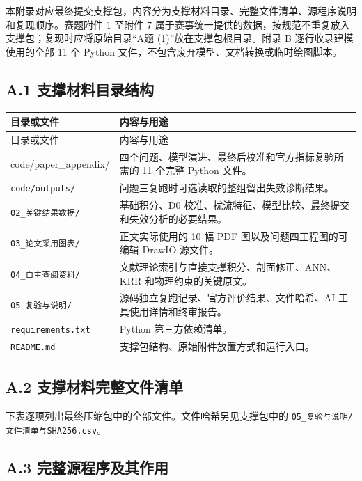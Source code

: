 本附录对应最终提交支撑包，内容分为支撑材料目录、完整文件清单、源程序说明和复现顺序。赛题附件 1 至附件 7 属于赛事统一提供的数据，按规范不重复放入支撑包；复现时应将原始目录“A题 (1)”放在支撑包根目录。附录 B 逐行收录建模使用的全部 11 个 Python 文件，不包含废弃模型、文档转换或临时绘图脚本。

\subsection*{A.1 支撑材料目录结构}

\begingroup
\small
\setlength{\tabcolsep}{4pt}
\begin{longtable}{p{}p{}}
\toprule
目录或文件 & 内容与用途 \\
\midrule
\endfirsthead
\toprule
目录或文件 & 内容与用途 \\
\midrule
\endhead
{\ttfamily\raggedright code/paper\_\allowbreak appendix/\par} & 四个问题、模型演进、最终后校准和官方指标复验所需的 11 个完整 Python 文件。 \\
\texttt{code/outputs/} & 问题三复跑时可选读取的整组留出失效诊断结果。 \\
\texttt{02\_关键结果数据/} & 基础积分、D0 校准、扰流特征、模型比较、最终提交和失效分析的必要结果。 \\
\texttt{03\_论文采用图表/} & 正文实际使用的 10 幅 PDF 图以及问题四工程图的可编辑 DrawIO 源文件。 \\
\texttt{04\_自主查阅资料/} & 文献理论索引与直接支撑积分、剖面修正、ANN、KRR 和物理约束的关键原文。 \\
\texttt{05\_复验与说明/} & 源码独立复跑记录、官方评价结果、文件哈希、AI 工具使用详情和终审报告。 \\
\texttt{requirements.txt} & Python 第三方依赖清单。 \\
\texttt{README.md} & 支撑包结构、原始附件放置方式和运行入口。 \\
\bottomrule
\end{longtable}
\endgroup

\subsection*{A.2 支撑材料完整文件清单}

下表逐项列出最终压缩包中的全部文件。文件哈希另见支撑包中的 \texttt{05\_复验与说明/文件清单与SHA256.csv}。



\subsection*{A.3 完整源程序及其作用}

